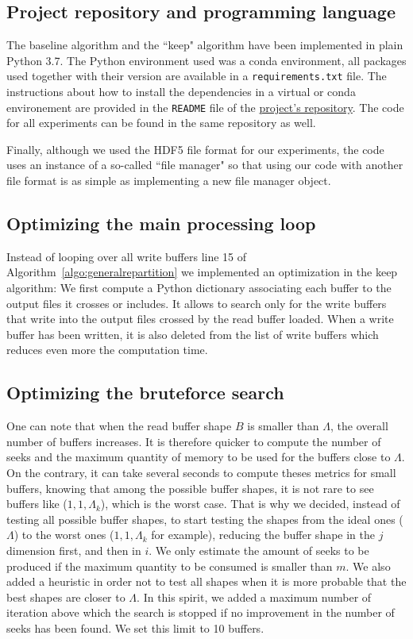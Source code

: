 \documentclass[sigconf, nonacm]{acmart}
\begin{document}
\subsection{Project repository and programming language}
The baseline algorithm and the ``keep" algorithm have been implemented in plain
Python 3.7.
The Python environment used was a conda environment, all packages used together
with their version are available in a \texttt{requirements.txt} file.
The instructions about how to install the dependencies in a virtual or conda
environement are provided in the \texttt{README} file of the
\href{https://github.com/GTimothee/repartition_experiments}{project's repository}.
The code for all experiments can be found in the same repository as well.

Finally, although we used the HDF5 file format for our experiments, the code
uses an instance of a so-called ``file manager" so that using our code with
another file format is as simple as implementing a new file manager object.

\subsection{Optimizing the main processing loop}
Instead of looping over all write buffers line 15 of
Algorithm~\ref{algo:generalrepartition} we implemented an optimization in
the keep algorithm:
We first compute a Python dictionary associating each buffer to the output files
it crosses or includes.
It allows to search only for the write buffers that write into the output files
crossed by the read buffer loaded. When a write buffer has been written, it
is also deleted from the list of write buffers which reduces even more the
computation time.

\subsection{Optimizing the bruteforce search}
One can note that when the read buffer shape $B$ is smaller than $\Lambda$,
the overall number of buffers increases.
It is therefore quicker to compute the number of seeks and the maximum
quantity of memory to be used for the buffers close to $\Lambda$.
On the contrary, it can take several seconds to compute theses metrics for
small buffers, knowing that among the possible buffer shapes, it is not rare to
see buffers like ($1,1,\Lambda_k$), which is the worst case.
That is why we decided, instead of testing all possible buffer shapes, to start
testing the shapes from the ideal ones ($\Lambda$) to the worst ones
($1,1,\Lambda_k$ for example), reducing the buffer shape in the $j$ dimension
first, and then in $i$.
We only estimate the amount of seeks to be produced if the maximum quantity
to be consumed is smaller than $m$.
We also added a heuristic in order not to test all shapes when it is more
probable that the best shapes are closer to $\Lambda$.
In this spirit, we added a maximum number of iteration above which the search
is stopped if no improvement in the number of seeks has been found.
We set this limit to 10 buffers.
\end{document}

